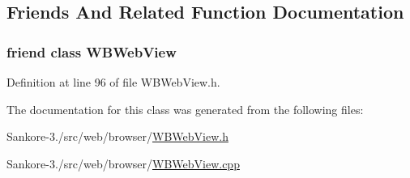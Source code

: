 \subsection{Friends And Related Function Documentation}
\hypertarget{class_w_b_web_page_aa27268d2723b1dcb297878072c611883}{
\subsubsection[{W\-B\-Web\-View}]{\setlength{\rightskip}{0pt plus 5cm}friend class {\bf W\-B\-Web\-View}\hspace{0.3cm}{\ttfamily [friend]}}}\label{dd/dc8/class_w_b_web_page_aa27268d2723b1dcb297878072c611883}


Definition at line 96 of file W\-B\-Web\-View.\-h.



The documentation for this class was generated from the following files\-:\begin{DoxyCompactItemize}
\item 
Sankore-\/3./src/web/browser/\hyperlink{_w_b_web_view_8h}{W\-B\-Web\-View.\-h}\item 
Sankore-\/3./src/web/browser/\hyperlink{_w_b_web_view_8cpp}{W\-B\-Web\-View.\-cpp}\end{DoxyCompactItemize}
